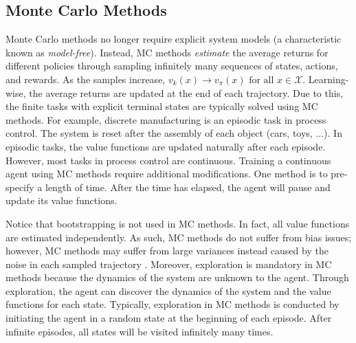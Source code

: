 \subsection{Monte Carlo Methods}
Monte Carlo methods no longer require explicit system models (a characteristic known as \textit{model-free}).  Instead, MC methods \textit{estimate} the average returns for different policies through sampling infinitely many sequences of states, actions, and rewards. As the samples increase, $v_k(x) \rightarrow v_{\pi}(x) \text{ for all } x \in \mathcal{X}$. Learning-wise, the average returns are updated at the end of each trajectory. Due to this, the finite tasks with explicit terminal states are typically solved using MC methods. For example, discrete manufacturing is an episodic task in process control. The system is reset after the assembly of each object (cars, toys, ...).  In episodic tasks, the value functions are updated naturally after each episode. However, most tasks in process control are continuous. Training a continuous agent using MC methods require additional modifications. One method is to pre-specify a length of time. After the time has elapsed, the agent will pause and update its value functions. 

Notice that bootstrapping is not used in MC methods.  In fact, all value functions are estimated independently. As such, MC methods do not suffer from bias issues; however, MC methods may suffer from large variances instead caused by the noise in each sampled trajectory \cite{sutton}. Moreover, exploration is mandatory in MC methods because the dynamics of the system are unknown to the agent. Through exploration, the agent can discover the dynamics of the system and the value functions for each state.  Typically, exploration in MC methods is conducted by initiating the agent in a random state at the beginning of each episode. After infinite episodes, all states will be visited infinitely many times.

